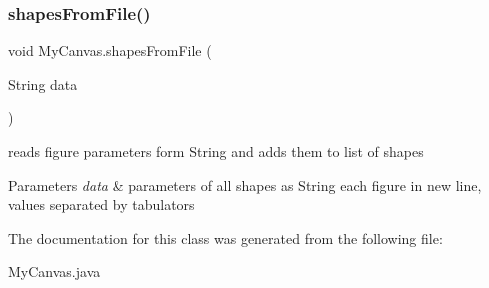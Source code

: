 \subsubsection{\texorpdfstring{shapes\+From\+File()}{shapesFromFile()}}
{\footnotesize\ttfamily void My\+Canvas.\+shapes\+From\+File (\begin{DoxyParamCaption}\item[{String}]{data }\end{DoxyParamCaption})\hspace{0.3cm}{\ttfamily [inline]}}

reads figure parameters form String and adds them to list of shapes 
\begin{DoxyParams}{Parameters}
{\em data} & parameters of all shapes as String each figure in new line, values separated by tabulators \\
\hline
\end{DoxyParams}


The documentation for this class was generated from the following file\+:\begin{DoxyCompactItemize}
\item 
My\+Canvas.\+java\end{DoxyCompactItemize}

